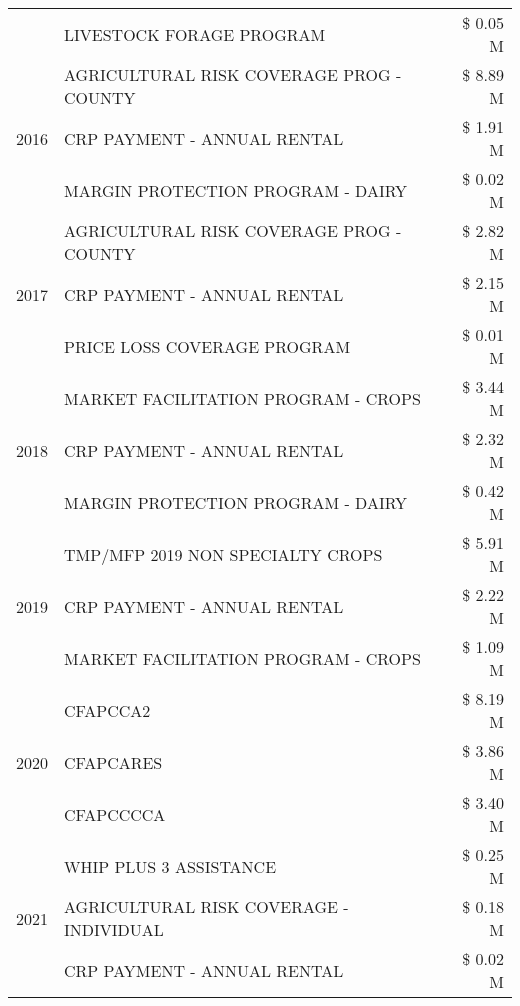 \begin{tabular}{llr}
 & LIVESTOCK FORAGE PROGRAM & \$ 0.05 M \\
\cline{1-3}
\multirow[t]{3}{*}{2016} & AGRICULTURAL RISK COVERAGE PROG - COUNTY      & \$ 8.89 M \\
 & CRP PAYMENT - ANNUAL RENTAL                   & \$ 1.91 M \\
 & MARGIN PROTECTION PROGRAM - DAIRY             & \$ 0.02 M \\
\cline{1-3}
\multirow[t]{3}{*}{2017} & AGRICULTURAL RISK COVERAGE PROG - COUNTY & \$ 2.82 M \\
 & CRP PAYMENT - ANNUAL RENTAL & \$ 2.15 M \\
 & PRICE LOSS COVERAGE PROGRAM & \$ 0.01 M \\
\cline{1-3}
\multirow[t]{3}{*}{2018} & MARKET FACILITATION PROGRAM - CROPS & \$ 3.44 M \\
 & CRP PAYMENT - ANNUAL RENTAL & \$ 2.32 M \\
 & MARGIN PROTECTION PROGRAM - DAIRY & \$ 0.42 M \\
\cline{1-3}
\multirow[t]{3}{*}{2019} & TMP/MFP 2019 NON SPECIALTY CROPS & \$ 5.91 M \\
 & CRP PAYMENT - ANNUAL RENTAL & \$ 2.22 M \\
 & MARKET FACILITATION PROGRAM - CROPS & \$ 1.09 M \\
\cline{1-3}
\multirow[t]{3}{*}{2020} & CFAPCCA2 & \$ 8.19 M \\
 & CFAPCARES & \$ 3.86 M \\
 & CFAPCCCCA & \$ 3.40 M \\
\cline{1-3}
\multirow[t]{3}{*}{2021} & WHIP PLUS 3 ASSISTANCE & \$ 0.25 M \\
 & AGRICULTURAL RISK COVERAGE - INDIVIDUAL & \$ 0.18 M \\
 & CRP PAYMENT - ANNUAL RENTAL & \$ 0.02 M \\
\cline{1-3}
\bottomrule
\end{tabular}
